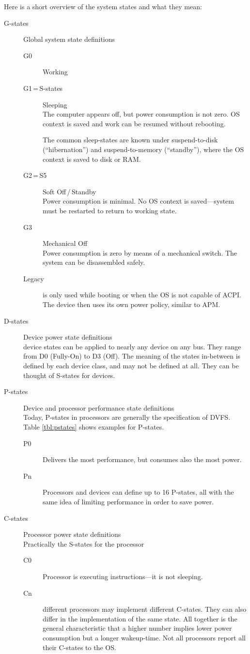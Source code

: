 \noindent
Here is a short overview of the system states and what they mean:

\begin{description}
\item[G-states] Global system state definitions
	\begin{description}
	\item[G0] Working
	\item[G1\,=\,S-states] Sleeping\\
The computer appears off, but power consumption is not zero. OS context is saved and work can be resumed without rebooting.

The common sleep-states are known under suspend-to-disk (``hibernation'') and suspend-to-memory (``standby''), where the OS context is saved to disk or RAM.
	\item[G2\,=\,S5] Soft Off\,/\,Standby\\
Power consumption is minimal. No OS context is saved---system must be restarted to return to working state.
	\item[G3] Mechanical Off\\
Power consumption is zero by means of a mechanical switch. The system can be disassembled safely.
	\item[Legacy] is only used while booting or when the OS is not capable of ACPI. The device then uses its own power policy, similar to APM.
	\end{description}
\item[D-states] Device power state definitions\\device states can be applied to nearly any device on any bus. They range from D0 (Fully-On) to D3 (Off). The meaning of the states in-between is defined by each device class, and may not be defined at all. They can be thought of S-states for devices.
\item[P-states] Device and processor performance state definitions\\
	Today, P-states in processors are generally the specification of DVFS. Table \ref{tbl:pstates} shows examples for P-states.
	\begin{description}
	\item[P0] Delivers the most performance, but consumes also the most power.
	\item[Pn] Processors and devices can define up to 16 P-states, all with the same idea of limiting performance in order to save power.
	\end{description}
\item[C-states] Processor power state definitions\\
	Practically the S-states for the processor
	\begin{description}
	\item[C0] Processor is executing instructions---it is not sleeping.
	\item[Cn] different processors may implement different C-states. They can also differ in the implementation of the same state. All together is the general characteristic that a higher number implies lower power consumption but a longer wakeup-time. Not all processors report all their C-states to the OS.
	\end{description}
\end{description}
